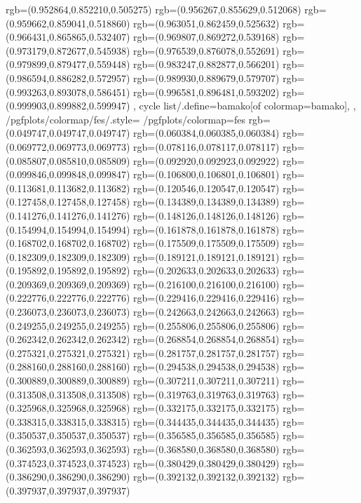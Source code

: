 {{{			rgb=(0.952864,0.852210,0.505275)
			rgb=(0.956267,0.855629,0.512068)
			rgb=(0.959662,0.859041,0.518860)
			rgb=(0.963051,0.862459,0.525632)
			rgb=(0.966431,0.865865,0.532407)
			rgb=(0.969807,0.869272,0.539168)
			rgb=(0.973179,0.872677,0.545938)
			rgb=(0.976539,0.876078,0.552691)
			rgb=(0.979899,0.879477,0.559448)
			rgb=(0.983247,0.882877,0.566201)
			rgb=(0.986594,0.886282,0.572957)
			rgb=(0.989930,0.889679,0.579707)
			rgb=(0.993263,0.893078,0.586451)
			rgb=(0.996581,0.896481,0.593202)
			rgb=(0.999903,0.899882,0.599947)
		},
	cycle list/.define={bamako}{[of colormap=bamako]},
	},
	/pgfplots/colormap/fes/.style={
		/pgfplots/colormap={fes}{%
			rgb=(0.049747,0.049747,0.049747)
			rgb=(0.060384,0.060385,0.060384)
			rgb=(0.069772,0.069773,0.069773)
			rgb=(0.078116,0.078117,0.078117)
			rgb=(0.085807,0.085810,0.085809)
			rgb=(0.092920,0.092923,0.092922)
			rgb=(0.099846,0.099848,0.099847)
			rgb=(0.106800,0.106801,0.106801)
			rgb=(0.113681,0.113682,0.113682)
			rgb=(0.120546,0.120547,0.120547)
			rgb=(0.127458,0.127458,0.127458)
			rgb=(0.134389,0.134389,0.134389)
			rgb=(0.141276,0.141276,0.141276)
			rgb=(0.148126,0.148126,0.148126)
			rgb=(0.154994,0.154994,0.154994)
			rgb=(0.161878,0.161878,0.161878)
			rgb=(0.168702,0.168702,0.168702)
			rgb=(0.175509,0.175509,0.175509)
			rgb=(0.182309,0.182309,0.182309)
			rgb=(0.189121,0.189121,0.189121)
			rgb=(0.195892,0.195892,0.195892)
			rgb=(0.202633,0.202633,0.202633)
			rgb=(0.209369,0.209369,0.209369)
			rgb=(0.216100,0.216100,0.216100)
			rgb=(0.222776,0.222776,0.222776)
			rgb=(0.229416,0.229416,0.229416)
			rgb=(0.236073,0.236073,0.236073)
			rgb=(0.242663,0.242663,0.242663)
			rgb=(0.249255,0.249255,0.249255)
			rgb=(0.255806,0.255806,0.255806)
			rgb=(0.262342,0.262342,0.262342)
			rgb=(0.268854,0.268854,0.268854)
			rgb=(0.275321,0.275321,0.275321)
			rgb=(0.281757,0.281757,0.281757)
			rgb=(0.288160,0.288160,0.288160)
			rgb=(0.294538,0.294538,0.294538)
			rgb=(0.300889,0.300889,0.300889)
			rgb=(0.307211,0.307211,0.307211)
			rgb=(0.313508,0.313508,0.313508)
			rgb=(0.319763,0.319763,0.319763)
			rgb=(0.325968,0.325968,0.325968)
			rgb=(0.332175,0.332175,0.332175)
			rgb=(0.338315,0.338315,0.338315)
			rgb=(0.344435,0.344435,0.344435)
			rgb=(0.350537,0.350537,0.350537)
			rgb=(0.356585,0.356585,0.356585)
			rgb=(0.362593,0.362593,0.362593)
			rgb=(0.368580,0.368580,0.368580)
			rgb=(0.374523,0.374523,0.374523)
			rgb=(0.380429,0.380429,0.380429)
			rgb=(0.386290,0.386290,0.386290)
			rgb=(0.392132,0.392132,0.392132)
			rgb=(0.397937,0.397937,0.397937)
}}}
